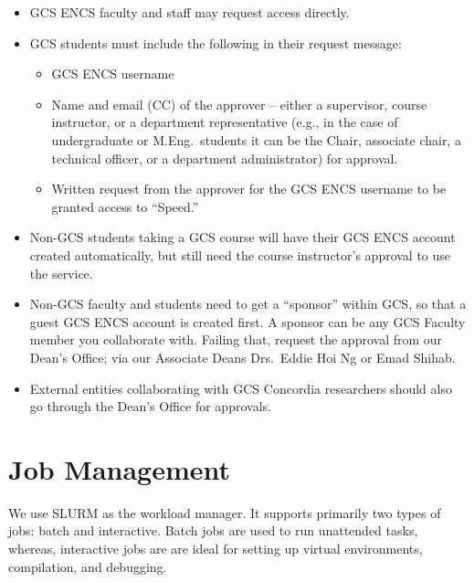 \documentclass{easychair}
\begin{document}
\begin{itemize} 
	\item GCS ENCS faculty and staff may request access directly.
	\item GCS students must include the following in their request message:
	\begin{itemize}
		\item GCS ENCS username
		\item Name and email (CC) of the approver -- either a supervisor, course instructor,
		or a department representative (e.g., in the case of undergraduate or M.Eng.\ students it
		can be the Chair, associate chair, a technical officer, or a department administrator) for approval.
		\item Written request from the
		approver
		for the GCS ENCS username to be granted access to ``Speed.''
	\end{itemize}
	\item Non-GCS students taking a GCS course will have their GCS ENCS account created automatically, but still need the course instructor's approval to use the service.
	\item Non-GCS faculty and students need to get a ``sponsor'' within GCS, so that a guest GCS ENCS account is created first. A sponsor can be any GCS Faculty member
	you collaborate with. Failing that, request the approval from our Dean's Office;
	via our Associate Deans Drs.~Eddie Hoi Ng or Emad Shihab.
	\item External entities collaborating with GCS Concordia researchers should also go through the Dean's Office for approvals.
\end{itemize}


\section{Job Management}
\label{sect:job-management}

We use SLURM as the workload manager. It supports primarily two types of jobs: batch and interactive.
Batch jobs are used to run unattended tasks, whereas, 
interactive jobs are are ideal for setting up virtual environments, compilation, and debugging.\\
\end{document}
